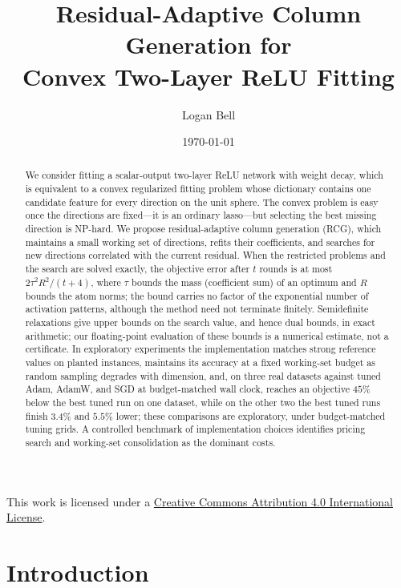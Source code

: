 \documentclass[12pt]{article}
\title{Residual-Adaptive Column Generation for\\
Convex Two-Layer ReLU Fitting}
\author{Logan Bell}
\date{\today}
\theoremstyle{plain}
\theoremstyle{definition}
\begin{document}
\maketitle

\begin{center}
\small This work is licensed under a
\href{https://creativecommons.org/licenses/by/4.0/}{Creative Commons
Attribution 4.0 International License}.
\end{center}

\begin{abstract}
We consider fitting a scalar-output two-layer ReLU network with weight decay,
which is equivalent to a convex regularized fitting problem whose dictionary
contains one candidate feature for every direction on the unit sphere. The
convex problem is easy once the directions are fixed---it is an ordinary
lasso---but selecting the best missing direction is NP-hard. We propose
residual-adaptive column generation (RCG), which maintains a small working set
of directions, refits their coefficients, and searches for new directions
correlated with the current residual. When the restricted problems and the
search are solved exactly, the objective error after $t$ rounds is at most
$2\tau^2R^2/(t+4)$, where $\tau$ bounds the mass (coefficient sum) of an
optimum and $R$ bounds the atom norms; the bound carries no factor of the exponential number of
activation patterns, although the method need not terminate finitely.
Semidefinite relaxations give upper bounds on the search value, and hence dual
bounds, in exact arithmetic; our floating-point evaluation of these bounds is a
numerical estimate, not a certificate. In exploratory experiments the
implementation matches strong reference values on planted instances, maintains
its accuracy at a fixed working-set budget as random sampling degrades with
dimension,
and, on three real datasets against tuned Adam, AdamW, and SGD at budget-matched
wall clock, reaches an objective $45\%$ below the best tuned run on one dataset,
while on the other two the best tuned runs finish $3.4\%$ and $5.5\%$ lower;
these comparisons are exploratory, under budget-matched tuning grids. A
controlled benchmark of implementation choices identifies pricing search and
working-set consolidation as the dominant costs.
\end{abstract}

\section{Introduction}\label{s-intro}
\end{document}
